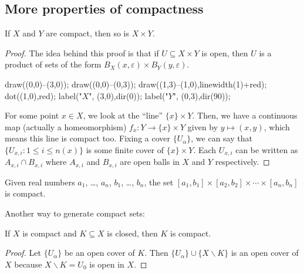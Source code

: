 \documentclass[10pt]{scrartcl}
\providecommand{\eps}{\varepsilon}
\providecommand{\setdiff}{\smallsetminus}
\begin{document}
\subsection{More properties of compactness}

\begin{theorem}\label{wk9:thm:prod-compact}
	If $X$ and $Y$ are compact, then so is $X\times Y$.
\end{theorem}

\begin{proof}
	The idea behind this proof is that
	if $U\subseteq X\times Y$ is open, then $U$ is a product of
	sets of the form $B_X(x, \eps)\times B_Y(y,\eps)$.
	
	\begin{center}
		\begin{asy}
			draw((0,0)--(3,0));
			draw((0,0)--(0,3));
			draw((1,3)--(1,0),linewidth(1)+red);
			dot((1,0),red);
			label("$X$", (3,0),dir(0));
			label("$Y$", (0,3),dir(90));
		\end{asy}
	\end{center}
	For some point $x\in X$, we look at the ``line''
	$\{x\}\times Y$.
	Then, we have a continuous map (actually a homeomorphism)
	$f_x\colon Y\to \{x\}\times Y$ given by $y\mapsto (x,y)$,
	which means this line is compact too.
	Fixing a cover $\{U_\alpha\}$, we can say that
	$\{U_{x, i} : 1\le i\le n(x)\}$ is some finite cover of $\{x\}\times Y$.
	Each $U_{x,i}$ can be written as $A_{x,i}\cap B_{x,i}$
	where $A_{x,i}$ and $B_{x,i}$ are open balls in $X$ and $Y$ respectively.
\end{proof}

\begin{corollary}\label{wk9:corollary:kcell-compact}
	Given real numbers $a_1$, \dots, $a_n$, $b_1$, \dots, $b_n$,
	the set $[a_1, b_1]\times [a_2, b_2]\times\cdots\times [a_n, b_n]$
	is compact.
\end{corollary}

Another way to generate compact sets:
\begin{lemma}\label{wk9:lemma:closed-subset-is-compact}
	If $X$ is compact and $K\subseteq X$ is closed, then $K$ is compact.
\end{lemma}

\begin{proof}
	Let $\{U_\alpha\}$ be an open cover of $K$.
	Then $\{U_\alpha\}\cup\{X \setdiff K\}$ is an open cover of $X$
	because $X\setdiff K = U_0$ is open in $X$.
\end{proof}
\end{document}
